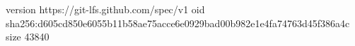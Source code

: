 version https://git-lfs.github.com/spec/v1
oid sha256:d605cd850e6055b11b58ae75acce6e0929bad00b982e1e4fa74763d45f386a4c
size 43840
